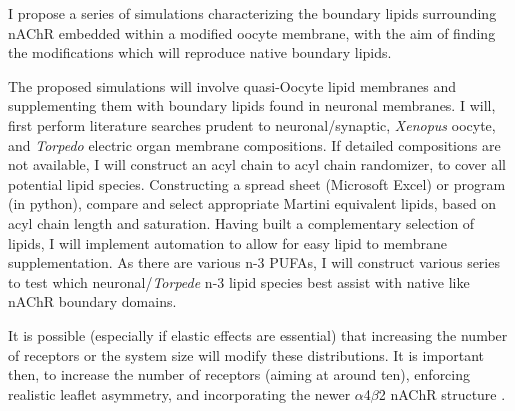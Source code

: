 I propose a series of simulations characterizing the boundary lipids surrounding nAChR embedded within a modified oocyte membrane, with the aim of finding the modifications which will reproduce native boundary lipids. %

The proposed simulations will involve quasi-Oocyte lipid membranes and supplementing them with boundary lipids found in neuronal membranes. I will, first perform literature searches prudent to neuronal/synaptic, \textit{Xenopus} oocyte, and \textit{Torpedo} electric organ membrane compositions. If detailed compositions are not available, I will construct an acyl chain to acyl chain randomizer, to cover all potential lipid species. Constructing a spread sheet (Microsoft Excel) or program (in python), compare and select appropriate Martini equivalent lipids, based on acyl chain length and saturation. Having built a complementary selection of lipids, I will implement automation to allow for easy lipid to membrane supplementation. As there are various n-3 PUFAs, I will construct various series to test which neuronal/\textit{Torpede} n-3 lipid species best assist with native like nAChR boundary domains.


It is possible (especially if elastic effects are essential) that increasing the number of receptors or the system size will modify these distributions. It is important then, to increase the number of receptors (aiming at around ten), enforcing realistic leaflet asymmetry, and incorporating the newer $\alpha$4$\beta$2 nAChR structure \cite{Morales-Perez_X_2016}. 


